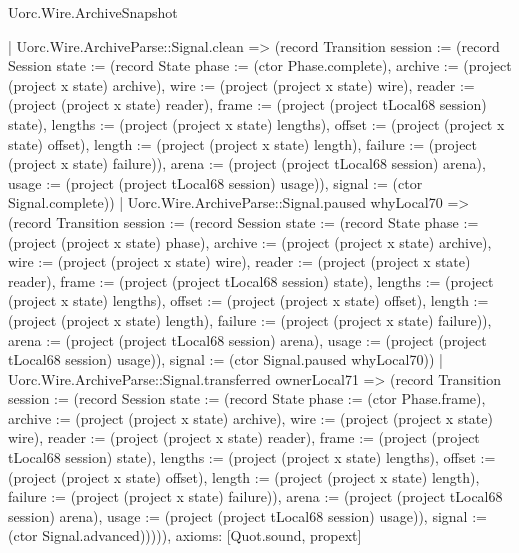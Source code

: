 \begin{lexlean}{Uorc.Wire.ArchiveSnapshot}
\begin{semanticmodule}
{      | Uorc.Wire.ArchiveParse::Signal.clean => (record Transition {session := (record Session {state := (record State {phase := (ctor Phase.complete), archive := (project (project x state) archive), wire := (project (project x state) wire), reader := (project (project x state) reader), frame := (project (project tLocal68 session) state), lengths := (project (project x state) lengths), offset := (project (project x state) offset), length := (project (project x state) length), failure := (project (project x state) failure)}), arena := (project (project tLocal68 session) arena), usage := (project (project tLocal68 session) usage)}), signal := (ctor Signal.complete)})
      | Uorc.Wire.ArchiveParse::Signal.paused whyLocal70 => (record Transition {session := (record Session {state := (record State {phase := (project (project x state) phase), archive := (project (project x state) archive), wire := (project (project x state) wire), reader := (project (project x state) reader), frame := (project (project tLocal68 session) state), lengths := (project (project x state) lengths), offset := (project (project x state) offset), length := (project (project x state) length), failure := (project (project x state) failure)}), arena := (project (project tLocal68 session) arena), usage := (project (project tLocal68 session) usage)}), signal := (ctor Signal.paused whyLocal70)})
      | Uorc.Wire.ArchiveParse::Signal.transferred ownerLocal71 => (record Transition {session := (record Session {state := (record State {phase := (ctor Phase.frame), archive := (project (project x state) archive), wire := (project (project x state) wire), reader := (project (project x state) reader), frame := (project (project tLocal68 session) state), lengths := (project (project x state) lengths), offset := (project (project x state) offset), length := (project (project x state) length), failure := (project (project x state) failure)}), arena := (project (project tLocal68 session) arena), usage := (project (project tLocal68 session) usage)}), signal := (ctor Signal.advanced)})))),
  axioms: [Quot.sound, propext]
}


\end{semanticmodule}
\end{lexlean}
